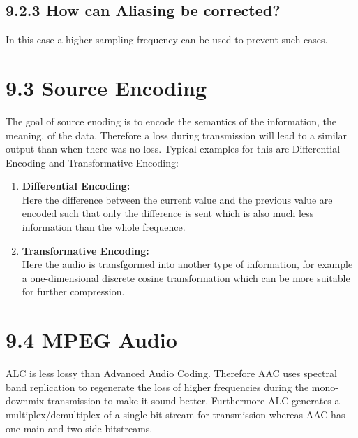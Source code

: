 \documentclass{article}
\begin{document}
\begin{adjustwidth}{2em}{2em}
		\subsection*{9.2.3 How can Aliasing be corrected?}
		\begin{adjustwidth}{2em}{2em}
			In this case a higher sampling frequency can be used to prevent such cases.
		\end{adjustwidth}
	\end{adjustwidth}
	
	\section*{9.3 Source Encoding}
	\begin{adjustwidth}{2em}{2em}
		The goal of source enoding is to encode the semantics of the information, the meaning, of the data. Therefore a loss during transmission will lead to a similar output than when there was no loss. Typical examples for this are Differential Encoding and Transformative Encoding: \\
		\begin{enumerate}
			\item \textbf{Differential Encoding:} \\
			Here the difference between the current value and the previous value are encoded such that only the difference is sent which is also much less information than the whole frequence.
			\item \textbf{Transformative Encoding:} \\
			Here the audio is transfgormed into another type of information, for example a one-dimensional discrete cosine transformation which can be more suitable for further compression.
		\end{enumerate}
	\end{adjustwidth}
	
	\section*{9.4 MPEG Audio}
	\begin{adjustwidth}{2em}{2em}
		ALC is less lossy than Advanced Audio Coding. Therefore AAC uses spectral band replication to regenerate the loss of higher frequencies during the mono-downmix transmission to make it sound better. Furthermore ALC generates a multiplex/demultiplex of a single bit stream for transmission whereas AAC has one main and two side bitstreams.
	\end{adjustwidth}
	
\end{document}
